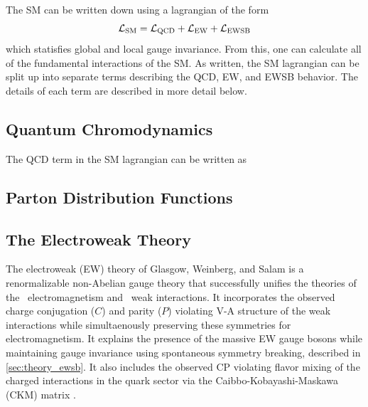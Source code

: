 The SM can be written down using a lagrangian of the form
\begin{equation}
\mathcal{L}_{\textrm{SM}} = \mathcal{L}_{\textrm{QCD}} + \mathcal{L}_{\textrm{EW}} + \mathcal{L}_{\textrm{EWSB}}
\end{equation}
which statisfies global and local gauge invariance.
From this, one can calculate all of the fundamental interactions of the SM.
As written, the SM lagrangian can be split up into separate terms describing the
QCD, EW, and EWSB behavior. 
The details of each term are described in more detail below.


\subsection{Quantum Chromodynamics}
The QCD term in the SM lagrangian can be written as
\subsection{Parton Distribution Functions}
\subsection{The Electroweak Theory}
\label{sec:theory_ew}
The electroweak (EW) 
theory of Glasgow, Weinberg, and 
Salam \cite{glashow:1961tr,Salam:1968rm,weinberg:1967tq}
is a renormalizable \cite{hooft1971renormalization,Hooft1971167}
non-Abelian gauge theory 
that successfully unifies the theories 
of the \uone~electromagnetism and \sutwo~weak interactions.
It incorporates the observed 
charge conjugation ($C$) 
and parity ($P$) violating V-A structure of the weak interactions
\cite{PhysRev.105.1413,Garwin:1957hc,PhysRev.106.1290}
while simultaenously preserving these symmetries for electromagnetism.
It explains the presence of the massive EW gauge bosons 
while maintaining gauge invariance
using spontaneous symmetry breaking, described in 
\sec\ref{sec:theory_ewsb}.
It also includes the observed CP violating 
\cite{PhysRevLett.13.138} 
flavor mixing of the 
charged interactions in the quark sector via 
the Caibbo-Kobayashi-Maskawa  (CKM)
matrix \cite{Cabibbo:1963yz,Kobayashi:1973fv}.

